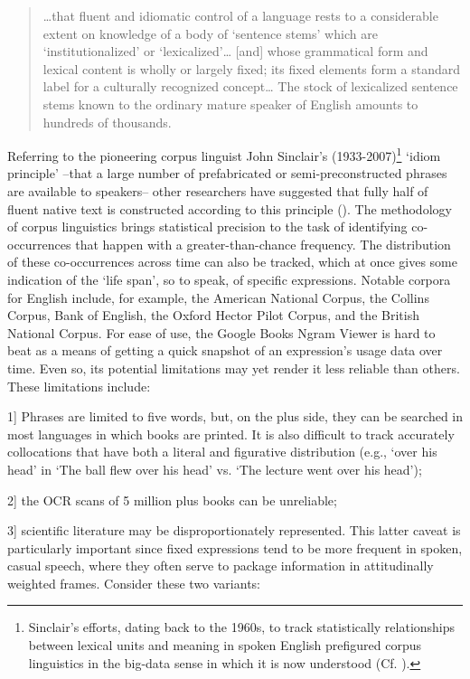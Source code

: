 \documentclass[output=paper]{langsci/langscibook}
\begin{document}
\begin{quote}
…that fluent and idiomatic control of a language rests to a considerable extent on knowledge of a body of ‘sentence stems’ which are ‘institutionalized’ or ‘lexicalized’… [and] whose grammatical form and lexical content is wholly or largely fixed; its fixed elements form a standard label for a culturally recognized concept… The stock of lexicalized sentence stems known to the ordinary mature speaker of English amounts to hundreds of thousands.  
\end{quote}

Referring to the pioneering corpus linguist John Sinclair’s (1933-2007)\footnote{ \textrm{Sinclair’s efforts, dating back to the 1960s, to track statistically relationships between lexical units and meaning in spoken English prefigured corpus linguistics in the big-data sense in which it is now understood (Cf. \citealt{chapelle_encyclopedia_2013-1}).}} ‘idiom principle’ –that a large number of prefabricated or semi-preconstructed phrases are available to speakers– other researchers have suggested that fully half of fluent native text is constructed according to this principle (\citealt[29]{erman_idiom_2000}). The methodology of corpus linguistics brings statistical precision to the task of identifying co-occurrences that happen with a greater-than-chance frequency.  The distribution of these co-occurrences across time can also be tracked, which at once gives some indication of the ‘life span’, so to speak, of specific expressions. Notable corpora for English include, for example, the American National Corpus, the Collins Corpus, Bank of English, the Oxford Hector Pilot Corpus, and the British National Corpus. For ease of use, the Google Books Ngram Viewer is hard to beat as a means of getting a quick snapshot of an expression’s usage data over time.  Even so, its potential limitations may yet render it less reliable than others. These limitations include: 

1] Phrases are limited to five words, but, on the plus side, they can be searched in most languages in which books are printed. It is also difficult to track accurately collocations that have both a literal and figurative distribution (e.g., ‘over his head’ in ‘The ball flew over his head’ vs. ‘The lecture went over his head’); 

2] the OCR scans of 5 million plus books can be unreliable; 

3] scientific literature may be disproportionately represented. This latter caveat is particularly important since fixed expressions tend to be more frequent in spoken, casual speech, where they often serve to package information in attitudinally weighted frames. Consider these two variants: 
\end{document}
